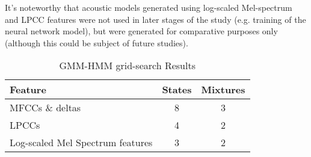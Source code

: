 It's noteworthy that acoustic models generated using log-scaled Mel-spectrum and LPCC features were not used in later stages of the study (e.g. training of the neural network model), but were generated for comparative purposes only (although this could be subject of future studies).

\begin{footnotesize}
	\begin{table}
		\centering
		\caption{GMM-HMM grid-search Results}
		\label{tab:grid_search_results}
		\begin{tabularx}{0.5\textwidth}{Xcc}
			\toprule
			\textbf{Feature} 			& \textbf{States} & \textbf{Mixtures}    \\
			\midrule
			MFCCs \& deltas	              		& 8                      & 3         \\[0.25cm]
			LPCCs             			& 4                      & 2         \\[0.25cm]
			Log-scaled Mel Spectrum features   			& 3  					 & 2         \\ 
			\bottomrule
		\end{tabularx}
		
	\end{table}\label{tab:gmmhmmgridsearch}
	
\end{footnotesize}

